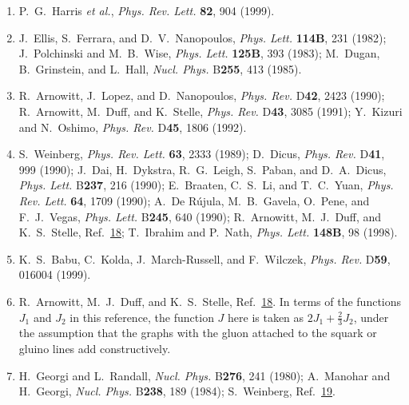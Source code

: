 \begin{enumerate}
  \item[16a.] \label{ch28-ref-16a}
  P.~G.~Harris \textit{et al.}, \textit{Phys. Rev. Lett.} \textbf{82},
  904 (1999).

  \item {}\label{ch28-ref-17}
  J.~Ellis, S.~Ferrara, and D.~V.~Nanopoulos, \textit{Phys. Lett.}
  \textbf{114B}, 231 (1982); J.~Polchinski and M.~B.~Wise,
  \textit{Phys. Lett.} \textbf{125B}, 393 (1983); M.~Dugan,
  B.~Grinstein, and L.~Hall, \textit{Nucl. Phys.} B\textbf{255}, 413
  (1985).

  \item {}\label{ch28-ref-18}
  R.~Arnowitt, J.~Lopez, and D.~Nanopoulos, \textit{Phys. Rev.}
  D\textbf{42}, 2423 (1990); R.~Arnowitt, M.~Duff, and K.~Stelle,
  \textit{Phys. Rev.} D\textbf{43}, 3085 (1991); Y.~Kizuri and
  N.~Oshimo, \textit{Phys. Rev.} D\textbf{45}, 1806 (1992).

  \item {}\label{ch28-ref-19}
  S.~Weinberg, \textit{Phys. Rev. Lett.} \textbf{63}, 2333 (1989);
  D.~Dicus, \textit{Phys. Rev.} D\textbf{41}, 999 (1990); J.~Dai,
  H.~Dykstra, R.~G.~Leigh, S.~Paban, and D.~A.~Dicus,
  \textit{Phys. Lett.} B\textbf{237}, 216 (1990); E.~Braaten,
  C.~S.~Li, and T.~C.~Yuan, \textit{Phys. Rev. Lett.} \textbf{64},
  1709 (1990); A.~De R\'ujula, M.~B.~Gavela, O.~Pene, and F.~J.~Vegas,
  \textit{Phys. Lett.} B\textbf{245}, 640 (1990); R.~Arnowitt,
  M.~J.~Duff, and K.~S.~Stelle, Ref.~\hyperref[ch28-ref-18]{18};
  T.~Ibrahim and P.~Nath, \textit{Phys. Lett.} \textbf{148B}, 98
  (1998).

  \item {}\label{ch28-ref-20}
  K.~S.~Babu, C.~Kolda, J.~March-Russell, and F.~Wilczek,
  \textit{Phys. Rev.} D\textbf{59}, 016004 (1999).

  \item {}\label{ch28-ref-21}
  R.~Arnowitt, M.~J.~Duff, and K.~S.~Stelle,
  Ref.~\hyperref[ch28-ref-18]{18}. In terms of the functions $J_1$ and
  $J_2$ in this reference, the function $J$ here is taken as
  $2J_1+\frac{2}{3}J_2$, under the assumption that the graphs with the
  gluon attached to the squark or gluino lines add constructively.

  \item {}\label{ch28-ref-22}
  H.~Georgi and L.~Randall, \textit{Nucl. Phys.} B\textbf{276}, 241
  (1980); A.~Manohar and H.~Georgi, \textit{Nucl. Phys.} B\textbf{238},
  189 (1984); S.~Weinberg, Ref.~\hyperref[ch28-ref-19]{19}.


\end{enumerate}
